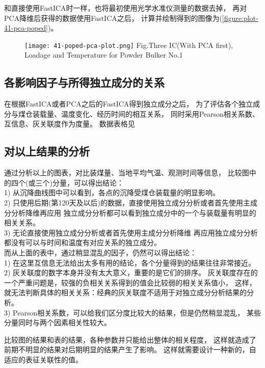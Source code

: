 和直接使用FastICA时一样，也将最初使用光学水准仪测量的数据去掉，
再对PCA降维后获得的数据使用FastICA之后，
计算并绘制得到的图像为(\ref{figure:plot-41-pca-poped})。
\begin{figure}[!htbp]
   \centering
   \texttt{[image: 41-poped-pca-plot.png]}
			{Fig.}{Three IC(With PCA first), Loadage and Temperature for Powder Bulker No.1}
\end{figure}


\subsection{各影响因子与所得独立成分的关系}
在根据FastICA或者PCA之后的FastICA得到独立成分之后，
为了评估各个独立成分与煤仓装载量、温度变化、经历时间的相互关系，
同时采用Pearson相关系数、互信息、灰关联度作为度量。
数据表格见 

%
%

\subsection{对以上结果的分析}
通过分析以上的图表，对比装煤量、当地平均气温、观测时间等信息，
比较图中的四个(或三个)分量，可以得出结论：\\
    1) 从沉降曲线图中可以看到，各点的沉降受煤仓装载量的明显影响。\\
    2) 只使用后期(第120天及以后)的数据，直接使用独立成分分析或者首先使用主成分分析降维再应用
       独立成分分析都可以看到独立成分中的一个与装载量有明显的相关关系。\\
    3) 无论直接使用独立成分分析或者首先使用主成分分析降维
       再应用独立成分分析都没有可以与时间和温度有对应关系的独立成分。 \\

而从上面的表中，通过稍显混乱的因子，仍然可以得出结论：\\
  1)  在这里互信息无法给出太多有用的结论，各个分量得到的结果往往非常接近。\\
  2)  灰关联度的数字本身并没有太大意义，重要的是它们的排序。 
      灰关联度存在的一个严重问题是，较强的负相关关系得到的值会比较弱的相关关系值小，
      这样，就无法判断具体的相关关系：经典的灰关联度不适用于对独立成分分析结果的分析。\\
  3) Pearson相关系数，可以给我们区分度比较大的结果，但是仍然稍显混乱，
      某些分量同时与两个因素相关性较大。

比较图的结果和表的结果，各种参数并只能给出整体的相关程度，
这样就造成了前期不明显的结果对后期明显的结果产生了影响。
这样就需要设计一种新的，自适应的表征关联性的值。


